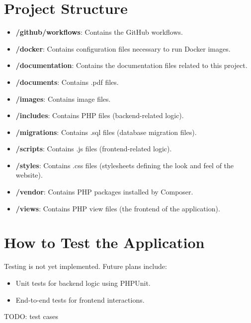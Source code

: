 \documentclass[12pt,a4paper]{report}
\begin{document}
\section{Project Structure}

\begin{itemize}
    \item \textbf{/github/workflows}: Contains the GitHub workflows.
    \item \textbf{/docker}: Contains configuration files necessary to run Docker images.
    \item \textbf{/documentation}: Contains the documentation files related to this project.
    \item \textbf{/documents}: Contains .pdf files.
    \item \textbf{/images}: Contains image files.
    \item \textbf{/includes}: Contains PHP files (backend-related logic).
    \item \textbf{/migrations}: Contains .sql files (database migration files).
    \item \textbf{/scripts}: Contains .js files (frontend-related logic).
    \item \textbf{/styles}: Contains .css files (stylesheets defining the look and feel of the website).
    \item \textbf{/vendor}: Contains PHP packages installed by Composer.
    \item \textbf{/views}: Contains PHP view files (the frontend of the application).
\end{itemize}

\section{How to Test the Application}
Testing is not yet implemented. Future plans include:
\begin{itemize}
    \item Unit tests for backend logic using PHPUnit.
    \item End-to-end tests for frontend interactions.
\end{itemize}

TODO: test cases
\end{document}
